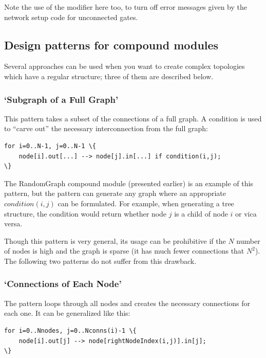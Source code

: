 Note the use of the  modifier
here too, to turn off error messages given by the network setup code
for unconnected gates.


\subsection{Design patterns for compound modules}


Several approaches can be used when you want to create complex
topologies which have a regular structure; three of them are
described below.


\subsubsection{`Subgraph of a Full Graph'}


This pattern takes a subset of the connections of a full graph.  A
condition is used to ``carve out'' the necessary interconnection from
the full graph:

\begin{Verbatim}[commandchars=\\\{\}]
for i=0..N-1, j=0..N-1 \{
    node[i].out[...] --> node[j].in[...] if condition(i,j);
\}
\end{Verbatim}

The RandomGraph compound module (presented earlier) is an example of
this pattern, but the pattern can generate any graph where an
appropriate $condition(i,j)$ can be formulated. For example,
when generating a tree structure, the condition
would return whether node $j$ is a child of node $i$ or
vica versa.

Though this pattern is very general, its usage can be prohibitive if
the $N$ number of nodes is high and the graph is sparse (it has
much fewer connections that $N^2$). The following
two patterns do not suffer from this drawback.


\subsubsection{`Connections of Each Node'}

The pattern loops through all nodes and creates the necessary
connections for each one. It can be generalized like this:

\begin{Verbatim}[commandchars=\\\{\}]
for i=0..Nnodes, j=0..Nconns(i)-1 \{
    node[i].out[j] --> node[rightNodeIndex(i,j)].in[j];
\}
\end{Verbatim}


